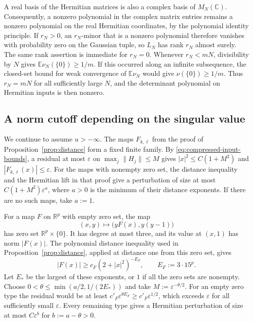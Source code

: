 A real basis of the Hermitian matrices is also a complex basis of $M_N(\mathbb C)$.
Consequently, a nonzero polynomial in the complex matrix entries remains a nonzero polynomial on the real Hermitian coordinates, by the polynomial identity principle.
If $r_N>0$, an $r_N$-minor that is a nonzero polynomial therefore vanishes with probability zero on the Gaussian tuple, so $L_N$ has rank $r_N$ almost surely.
The same rank assertion is immediate for $r_N=0$.
Whenever $r_N<mN$, divisibility by $N$ gives $\mathbb E\nu_N(\{0\})\ge 1/m$.
If this occurred along an infinite subsequence, the closed-set bound for weak convergence of $\mathbb E\nu_N$ would give $\nu(\{0\})\ge1/m$.
Thus $r_N=mN$ for all sufficiently large $N$, and the determinant polynomial on Hermitian inputs is then nonzero.

\subsection{A norm cutoff depending on the singular value}\label{subsec:global-floor}

We continue to assume $u>-\infty$.
The maps $F_{k,\ell}$ from the proof of Proposition~\ref{prop:distance} form a fixed finite family.
By \eqref{eq:compressed-input-bounds}, a residual at most $\varepsilon$ on $\max_j\|H_j\|\le M$ gives $|x|^2\le C(1+M^2)$ and $|F_{k,\ell}(x)|\le\varepsilon$.
For the maps with nonempty zero set, the distance inequality and the Hermitian lift in that proof give a perturbation of size at most $C(1+M^2)\varepsilon^a$, where $a>0$ is the minimum of their distance exponents.
If there are no such maps, take $a:=1$.

For a map $F$ on $\mathbb R^p$ with empty zero set, the map
\[
 (x,y)\longmapsto \bigl(yF(x),y(y-1)\bigr)
\]
has zero set $\mathbb R^p\times\{0\}$.
It has degree at most three, and its value at $(x,1)$ has norm $|F(x)|$.
The polynomial distance inequality used in Proposition~\ref{prop:distance}, applied at distance one from this zero set, gives
\[
 |F(x)|\ge c_F(2+|x|^2)^{-E_F},\qquad E_F:=3\cdot15^p.
\]
Let $E_*$ be the largest of these exponents, or $1$ if all the zero sets are nonempty.
Choose $0<\theta\le\min(a/2,1/(2E_*))$ and take $M:=\varepsilon^{-\theta/2}$.
For an empty zero type the residual would be at least $c'_F\varepsilon^{\theta E_F}\ge c'_F\varepsilon^{1/2}$, which exceeds $\varepsilon$ for all sufficiently small $\varepsilon$.
Every remaining type gives a Hermitian perturbation of size at most $C\varepsilon^b$ for $b:=a-\theta>0$.

